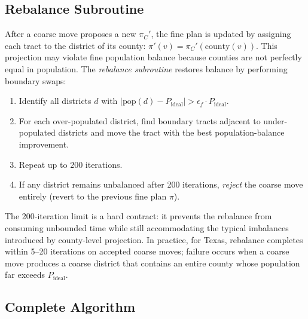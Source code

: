\subsection{Rebalance Subroutine}

After a coarse move proposes a new $\pi_C'$, the fine plan is updated by
assigning each tract to the district of its county:
$\pi'(v) = \pi_C'(\mathrm{county}(v))$.
This projection may violate fine population balance because counties are not
perfectly equal in population.
The \emph{rebalance subroutine} restores balance by performing boundary swaps:

\begin{enumerate}
  \item Identify all districts $d$ with $|\mathrm{pop}(d) - P_{\mathrm{ideal}}|
        > \epsilon_f \cdot P_{\mathrm{ideal}}$.
  \item For each over-populated district, find boundary tracts adjacent to
        under-populated districts and move the tract with the best
        population-balance improvement.
  \item Repeat up to 200 iterations.
  \item If any district remains unbalanced after 200 iterations, \emph{reject}
        the coarse move entirely (revert to the previous fine plan $\pi$).
\end{enumerate}

The 200-iteration limit is a hard contract: it prevents the rebalance from
consuming unbounded time while still accommodating the typical imbalances
introduced by county-level projection.
In practice, for Texas, rebalance completes within 5--20 iterations on
accepted coarse moves; failure occurs when a coarse move produces a coarse
district that contains an entire county whose population far exceeds
$P_{\mathrm{ideal}}$.

\subsection{Complete Algorithm}

